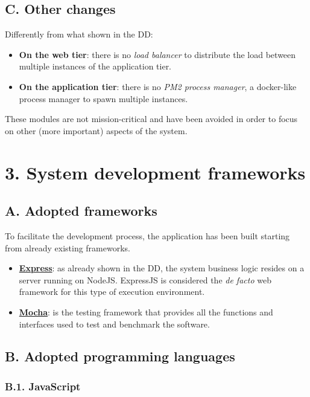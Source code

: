 \section{C. Other changes}

Differently from what shown in the DD:
\begin{itemize}
  \item \textbf{On the web tier}: there is no \emph{load balancer} to distribute the load between multiple instances of the application tier.
  \item \textbf{On the application tier}: there is no \emph{PM2 process manager}, a docker-like process manager to spawn multiple instances.
\end{itemize}
These modules are not mission-critical and have been avoided in order to focus on other (more important) aspects of the system.

\chapter{3. System development frameworks}

\section{A. Adopted frameworks}

To facilitate the development process, the application has been built starting from already existing frameworks.

\begin{itemize}
  \item \textbf{\href{https://www.npmjs.com/package/express}{Express}}: as already shown in the DD, the system business logic resides on a server running on NodeJS.
  ExpressJS is considered the \emph{de facto} web framework for this type of execution environment.
  \item \textbf{\href{https://www.npmjs.com/package/mocha}{Mocha}}: is the testing framework that provides all the functions and interfaces used to test and benchmark the software.
\end{itemize}

\section{B. Adopted programming languages}

\subsection{B.1. JavaScript}


